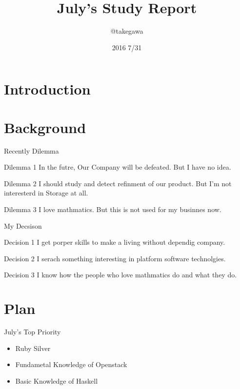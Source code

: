 \documentclass[12pt, unicode]{beamer}
\title{July's Study Report}
\author{@takegawa}
\date[today]{ 2016 7/31}
\institute{Tokyo Univerisity etc}
\begin{document}
\frame{\maketitle}

\section{Introduction}

\begin{frame}{}
 \tableofcontents
\end{frame}

\section{Background}
\label{sec:background}
\begin{frame}{Recently Dilemma}
  \begin{block}{Dilemma 1}
  In the futre, Our Company will be defeated. But I have no idea.
  \end{block}
  \begin{block}{Dilemma 2}
    I should study and detect refinment of our product. But I'm not interesterd in Storage at all.
  \end{block}
  \begin{block}{Dilemma 3}
    I love mathmatics. But this is not used for my businnes now.
  \end{block}
\end{frame}

\begin{frame}{My Decsison}
  \begin{block}{Decision 1}
    I  get porper skills  to make a living without dependig company.
  \end{block}

  \begin{block}{Decision 2}
    I serach something interesting in platform software technolgies.
  \end{block}

  \begin{block}{Decision 3}
    I know how the people who love mathmatics do and what they do.
  \end{block}

\end{frame}

\section{Plan}
\begin{frame}{July's Top Priority}
  \begin{itemize}
    \item Ruby Silver
    \item Fundametal Knowledge of Openstack
    \item Basic Knowledge of Haskell
  \end{itemize}
\end{frame}
\end{document}
